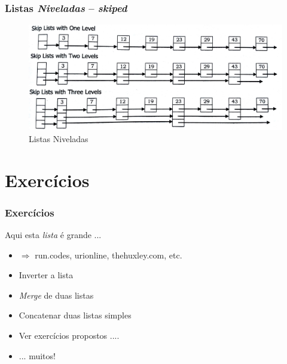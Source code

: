 
\begin{frame}%

\frametitle{Listas \textit{Niveladas} -- \textit{skiped}}

\begin{figure}[!hb]
	\centering
	\includegraphics[height=0.50\paperheight, width=0.7\paperwidth]{figs/fig_listas/skipped_listas.jpg}						
			\caption{Listas Niveladas}	
		\end{figure} 

\end{frame} 




\section{Exercícios}

\begin{frame}%

\frametitle{Exercícios}

\begin{block}{Aqui esta \textit{lista} é grande ... }

\begin{itemize}

	\item $\Rightarrow $ run.codes, urionline, thehuxley.com, etc.
	
  \item Inverter a lista
  \item \textit{Merge} de duas listas
  \item Concatenar duas listas simples
  \item Ver exercícios propostos ....
  \item ... muitos!
  
  
  
\end{itemize}


\end{block}


\end{frame} 


